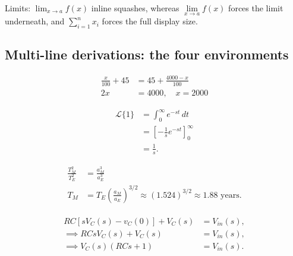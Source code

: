 \documentclass[11pt,a4paper]{article}
\theoremstyle{definition}                   %
\begin{document}
Limits: $\lim_{x \to a} f(x)$ inline squashes, whereas
$\lim\limits_{x \to a} f(x)$ forces the limit underneath, and
$\displaystyle\sum_{i=1}^{n} x_i$ forces the full display size.

\subsection{Multi-line derivations: the four environments}

%
%

\begin{align}
    \frac{x}{100} + 45 &= 45 + \frac{4000 - x}{100} \\
    2x &= 4000, \quad x = 2000
\end{align}

\begin{equation}
\begin{split}
    \mathcal{L}\{1\} &= \int_{0}^{\infty} e^{-st}\,dt \\
                     &= \left[-\frac{1}{s}e^{-st}\right]_{0}^{\infty} \\
                     &= \frac{1}{s}.
\end{split}
\label{eq:laplace-one}
\end{equation}

\begin{equation*}
\begin{split}
    \frac{T_M^2}{T_E^2} &= \frac{a_M^3}{a_E^3} \\
    T_M &= T_E \left( \frac{a_M}{a_E} \right)^{3/2}
         \approx (1.524)^{3/2} \approx 1.88 \text{ years}.
\end{split}
\end{equation*}

\begin{align}
    \begin{split}
    RC \left[ sV_{C}(s) - v_{C}(0) \right] + V_{C}(s) &= V_{in}(s), \\
    \implies RCsV_{C}(s) + V_{C}(s) &= V_{in}(s), \\
    \implies V_{C}(s)(RCs + 1) &= V_{in}(s).
    \end{split}
    \label{eq:laplace-process}
\end{align}
\end{document}
